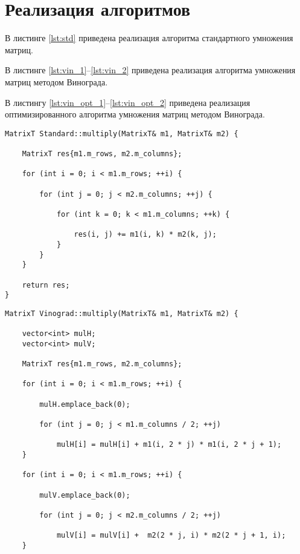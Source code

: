 \section{Реализация алгоритмов}
В листинге \ref{lst:std} приведена реализация алгоритма стандартного умножения матриц.

В листинге \ref{lst:vin_1}--\ref{lst:vin_2} приведена реализация алгоритма умножения матриц методом Винограда.

В листингу \ref{lst:vin_opt_1}--\ref{lst:vin_opt_2} приведена реализация оптимизированного алгоритма умножения матриц методом Винограда.

\begin{lstlisting}[label=lst:std, caption=Функция стандартного умножения матриц]
MatrixT Standard::multiply(MatrixT& m1, MatrixT& m2) {

    MatrixT res{m1.m_rows, m2.m_columns};

    for (int i = 0; i < m1.m_rows; ++i) {

        for (int j = 0; j < m2.m_columns; ++j) {

            for (int k = 0; k < m1.m_columns; ++k) {

                res(i, j) += m1(i, k) * m2(k, j);
            }
        }
    }

    return res;
}    
\end{lstlisting}

\clearpage

\begin{lstlisting}[label=lst:vin_1, caption=Функция умножения матриц методом Винограда (часть 1)]
MatrixT Vinograd::multiply(MatrixT& m1, MatrixT& m2) {

    vector<int> mulH;
    vector<int> mulV;

    MatrixT res{m1.m_rows, m2.m_columns};

    for (int i = 0; i < m1.m_rows; ++i) {

        mulH.emplace_back(0);

        for (int j = 0; j < m1.m_columns / 2; ++j) 

            mulH[i] = mulH[i] + m1(i, 2 * j) * m1(i, 2 * j + 1); 
    }

    for (int i = 0; i < m1.m_rows; ++i) {

        mulV.emplace_back(0);

        for (int j = 0; j < m2.m_columns / 2; ++j) 

            mulV[i] = mulV[i] +  m2(2 * j, i) * m2(2 * j + 1, i); 
    }
\end{lstlisting}

